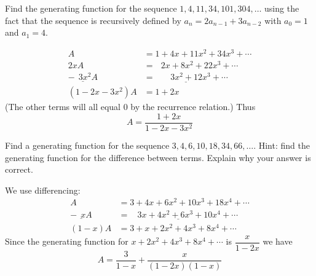 \documentclass[11pt]{exam}
\def\d{\displaystyle}
\begin{document}
\begin{questions}


\question[4] Find the generating function for the sequence $1, 4, 11, 34, 101, 304, \ldots$ using the fact that the sequence is recursively defined by $a_n = 2 a_{n-1} + 3a_{n-2}$ with $a_0 = 1$ and $a_1 = 4$.  

\begin{solution}
  \begin{align*}
    A & = 1 + 4x + 11x^2 + 34x^3 + \cdots \\
    2xA & = ~~~ 2x + 8x^2 + 22x^3 + \cdots \\
    \underline{- ~~ 3x^2A } & \underline{ = ~~~~~~~~3x^2 + 12x^3 + \cdots} \\
    (1-2x-3x^2)A & = 1 + 2x
  \end{align*}
(The other terms will all equal 0 by the recurrence relation.)  Thus
\[A = \frac{1+2x}{1-2x-3x^2}\]
\end{solution}


\question[4] Find a generating function for the sequence $3, 4, 6, 10, 18, 34, 66, \ldots$.  Hint: find the generating function for the difference between terms. Explain why your answer is correct.
\begin{solution}
We use differencing:
  \begin{align*}
    A & = 3 + 4x + 6x^2 + 10x^3 + 18x^4 + \cdots \\
    \underline{ - ~~xA } & \underline{ = ~~~~ 3x + 4x^2 + 6x^3 + 10x^4 + \cdots }\\
    (1-x)A & = 3 + x + 2x^2 + 4x^3 + 8x^4 + \cdots
  \end{align*}
  Since the generating function for $x + 2x^2 + 4x^3 + 8x^4 + \cdots$ is $\dfrac{x}{1-2x}$ we have
  \[A = \frac{3}{1-x} + \frac{x}{(1-2x)(1-x)}\]
\end{solution}



\end{questions}
\end{document}

